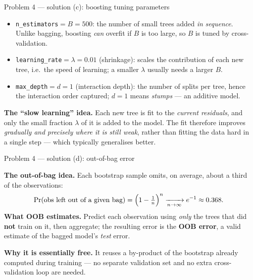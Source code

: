 \documentclass[aspectratio=169,11pt]{beamer}
\begin{document}
\begin{frame}{Problem 4 --- solution (c): boosting tuning parameters}
  \begin{solutionbox}
    \begin{itemize}
      \item \texttt{n\_estimators}$=B=500$: the number of small trees added \emph{in sequence}.
        Unlike bagging, boosting \emph{can} overfit if $B$ is too large, so $B$ is tuned by
        cross-validation.
      \item \texttt{learning\_rate}$=\lambda=0.01$ (shrinkage): scales the contribution of each new
        tree, i.e.\ the speed of learning; a smaller $\lambda$ usually needs a larger $B$.
      \item \texttt{max\_depth}$=d=1$ (interaction depth): the number of splits per tree, hence the
        interaction order captured; $d=1$ means \emph{stumps} --- an additive model.
    \end{itemize}
    \textbf{The ``slow learning'' idea.} Each new tree is fit to the \emph{current residuals}, and
    only the small fraction $\lambda$ of it is added to the model. The fit therefore improves
    \emph{gradually and precisely where it is still weak}, rather than fitting the data hard in a
    single step --- which typically generalises better.
  \end{solutionbox}
\end{frame}

\begin{frame}{Problem 4 --- solution (d): out-of-bag error}
  \begin{solutionbox}
    \textbf{The out-of-bag idea.} Each bootstrap sample omits, on average, about a third of the
    observations:
    \[
      \Pr(\text{obs left out of a given bag})=\Bigl(1-\tfrac1n\Bigr)^{n}\xrightarrow[n\to\infty]{}e^{-1}\approx 0.368.
    \]
    \textbf{What OOB estimates.} Predict each observation using \emph{only} the trees that did
    \textbf{not} train on it, then aggregate; the resulting error is the \textbf{OOB error}, a valid
    estimate of the bagged model's \emph{test} error.
    \medskip

    \textbf{Why it is essentially free.} It reuses a by-product of the bootstrap already computed
    during training --- no separate validation set and no extra cross-validation loop are needed.
  \end{solutionbox}
\end{frame}
\end{document}

